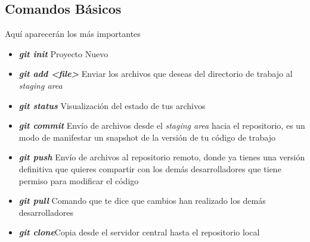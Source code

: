 \documentclass[letterpaper,12pt]{article}
\begin{document}
\subsection{Comandos Básicos}
Aquí aparecerán los más importantes
\begin{itemize}
\item \textbf{\textit{git init}} Proyecto Nuevo
\item \textbf{\textit{git add <file>}} Enviar los archivos que deseas del directorio de trabajo al \textit{staging area}
\item \textbf{\textit{git status}} Visualización del estado de tus archivos
\item \textbf{\textit{git commit}} Envío de archivos desde el \textit{staging area} hacia el repositorio, es un modo de manifestar un snapshot de la versión de tu código de trabajo
\item \textbf{\textit{git push}} Envío de archivos al repositorio remoto, donde ya tienes una versión definitiva que quieres compartir con los demás desarrolladores que tiene permiso para modificar el código
\item \textbf{\textit{git pull}} Comando que te dice que cambios han realizado los demás desarrolladores
\item \textbf{\textit{git clone}}Copia desde el servidor central hasta el repositorio local

\end{itemize}
\end{document}
